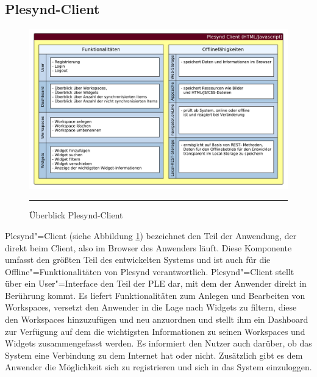 \subsection{Plesynd-Client}
\begin{figure}
  \centering
  \includegraphics[width=\textwidth,keepaspectratio]{./Figures/konzeptionelle_loesung_plesynd_client.pdf}
    \rule{35em}{0.5pt}
  \caption[Überblick Plesynd-Client]{Überblick Plesynd-Client}
  \label{fig:ueberblick_plesynd_client}
\end{figure}
Plesynd"=Client (siehe Abbildung \ref{fig:ueberblick_plesynd_client}) bezeichnet den Teil der Anwendung, der direkt beim Client, also im Browser des Anwenders läuft. Diese Komponente umfasst den größten Teil des entwickelten Systems und ist auch für die Offline"=Funktionalitäten von Plesynd verantwortlich. Plesynd"=Client stellt über ein User"=Interface den Teil der PLE dar, mit dem der Anwender direkt in Berührung kommt. Es liefert Funktionalitäten zum Anlegen und Bearbeiten von Workspaces, versetzt den Anwender in die Lage nach Widgets zu filtern, diese den Workspaces hinzuzufügen und neu anzuordnen und stellt ihm ein Dashboard zur Verfügung auf dem die wichtigsten Informationen zu seinen Workspaces und Widgets zusammengefasst werden. Es informiert den Nutzer auch darüber, ob das System eine Verbindung zu dem Internet hat oder nicht. Zusätzlich gibt es dem Anwender die Möglichkeit sich zu registrieren und sich in das System einzuloggen. 

